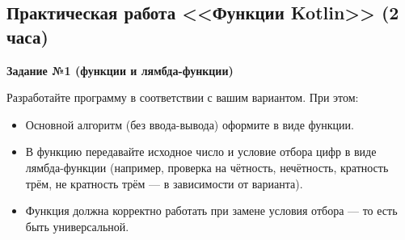 \subsection{Практическая работа <<Функции Kotlin>> (2 часа)}

\textbf{Задание №1 (функции и лямбда-функции)}

Разработайте программу в соответствии с вашим вариантом. При этом:

\begin{itemize}
\item Основной алгоритм (без ввода-вывода) оформите в виде функции.
    \item В функцию передавайте исходное число и условие отбора цифр в виде лямбда-функции (например, проверка на чётность, нечётность, кратность трём, не кратность трём — в зависимости от варианта).
    \item Функция должна корректно работать при замене условия отбора — то есть быть универсальной.
\end{itemize}

